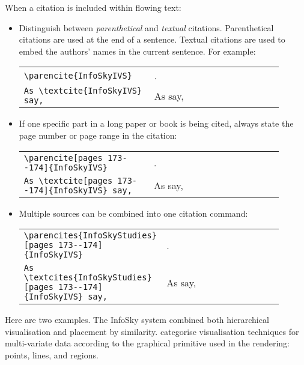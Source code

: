 When a citation is included within flowing text:
\begin{itemize}
\item Distinguish between \emph{parenthetical} and \emph{textual}
  citations. Parenthetical citations are used at the end of a
  sentence. Textual citations are used to embed the authors' names in
  the current sentence. For example:

\begin{small}
\hspace{2\parindent}
\renewcommand{\arraystretch}{1.5}
\begin{tabular}{p{0.45\linewidth}p{0.45\linewidth}}
\lstinline|\parencite{InfoSkyIVS}|        & \parencite{InfoSkyIVS}. \\
\lstinline|As \textcite{InfoSkyIVS} say,| & As \textcite{InfoSkyIVS} say,
\end{tabular}
\end{small}


\item If one specific part in a long paper or book is being cited,
  always state the page number or page range in the citation:

\begin{small}
\hspace{2\parindent}
\renewcommand{\arraystretch}{1.5}
\begin{tabular}{p{0.45\linewidth}p{0.45\linewidth}}
\lstinline|\parencite[pages 173--174]{InfoSkyIVS}|        &
  \parencite[pages 173--174]{InfoSkyIVS}. \\
\lstinline|As \textcite[pages 173--174]{InfoSkyIVS} say,| &
  As \textcite[pages 173--174]{InfoSkyIVS} say,
\end{tabular}
\end{small}



\item Multiple sources can be combined into one citation
command:

\begin{small}
\hspace{2\parindent}
\renewcommand{\arraystretch}{1.5}
\begin{tabular}{p{0.45\linewidth}p{0.45\linewidth}}
\lstinline|\parencites{InfoSkyStudies}[pages 173--174]{InfoSkyIVS}| &
  \parencites{InfoSkyStudies}[pages 173--174]{InfoSkyIVS}. \\
\lstinline|As \textcites{InfoSkyStudies}[pages 173--174]{InfoSkyIVS} say,| &
  As \textcites{InfoSkyStudies}[pages 173--174]{InfoSkyIVS} say,
\end{tabular}
\end{small}


\end{itemize}


Here are two examples. The InfoSky \parencite{InfoSkyIVS} system
combined both hierarchical visualisation and placement by similarity.
\textcite[Chapter~7]{InteractiveDataVisualisation} categorise
visualisation techniques for multi-variate data according to the
graphical primitive used in the rendering: points, lines, and regions.






